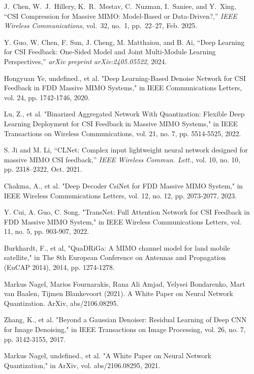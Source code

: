\documentclass[lettersize,journal]{IEEEtran}
\begin{document}
\begin{thebibliography}{00}
    J.~Chen, W.~J.~Hillery, K.~R.~Mestav, C.~Nuzman, I.~Saniee, and Y.~Xing, ``CSI Compression for Massive MIMO: Model-Based or Data-Driven?,'' \emph{IEEE Wireless Communications}, vol.~32, no.~1, pp.~22--27, Feb. 2025.

    Y. Guo, W. Chen, F. Sun, J. Cheng, M. Matthaiou, and B. Ai, ``Deep Learning for CSI Feedback: One-Sided Model and Joint Multi-Module Learning Perspectives,'' \textit{arXiv preprint arXiv:2405.05522}, 2024.

    Hongyuan Ye, undefined., et al. "Deep Learning-Based Denoise Network for CSI Feedback in FDD Massive MIMO Systems," in IEEE Communications Letters, vol. 24, pp. 1742-1746, 2020.

    Lu, Z., et al. "Binarized Aggregated Network With Quantization: Flexible Deep Learning Deployment for CSI Feedback in Massive MIMO Systems," in IEEE Transactions on Wireless Communications, vol. 21, no. 7, pp. 5514-5525, 2022.

    S. Ji and M. Li, ``CLNet: Complex input lightweight neural network designed for massive MIMO CSI feedback,'' \textit{IEEE Wireless Commun. Lett.}, vol. 10, no. 10, pp. 2318--2322, Oct. 2021.

    Chakma, A., et al. "Deep Decoder CsiNet for FDD Massive MIMO System," in IEEE Wireless Communications Letters, vol. 12, no. 12, pp. 2073-2077, 2023.

    Y. Cui, A. Guo, C. Song. "TransNet: Full Attention Network for CSI Feedback in FDD Massive MIMO System," in IEEE Wireless Communications Letters, vol. 11, no. 5, pp. 903-907, 2022.

    Burkhardt, F., et al, "QuaDRiGa: A MIMO channel model for land mobile satellite," in The 8th European Conference on Antennas and Propagation (EuCAP 2014), 2014, pp. 1274-1278.

    Markus Nagel, Marios Fournarakis, Rana Ali Amjad, Yelysei Bondarenko, Mart van Baalen, Tĳmen Blankevoort (2021). A White Paper on Neural Network Quantization. ArXiv, abs/2106.08295.

    Zhang, K., et al. "Beyond a Gaussian Denoiser: Residual Learning of Deep CNN for Image Denoising," in IEEE Transactions on Image Processing, vol. 26, no. 7, pp. 3142-3155, 2017.

    Markus Nagel, undefined., et al. "A White Paper on Neural Network Quantization," in ArXiv, vol. abs/2106.08295, 2021.


\end{thebibliography}
\end{document}
